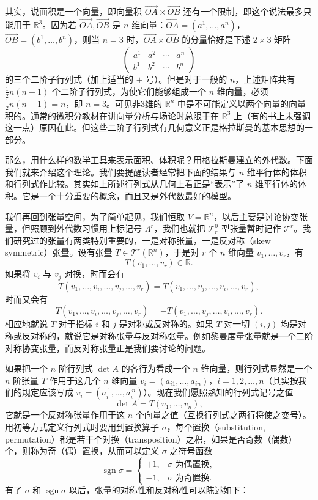 其实，说面积是一个向量，即向量积 $\overrightarrow{OA}\times\overrightarrow{OB}$ 还有一个限制，即这个说法最多只能用于 $\mathbb R^3$。因为若 $\overrightarrow{OA},\overrightarrow{OB}$ 是 $n$ 维向量：$\overrightarrow{OA}=(a^1,\ldots,a^n)$，$\overrightarrow{OB}=(b^1,\ldots,b^n)$，则当 $n=3$ 时，$\overrightarrow{OA}\times\overrightarrow{OB}$ 的分量恰好是下述 $2\times3$ 矩阵
\[
 \begin{pmatrix}a^1&a^2&\cdots&a^n\\ b^1&b^2&\cdots&b^n\end{pmatrix}
\]
的三个二阶子行列式（加上适当的 $\pm$ 号）。但是对于一般的 $n$，上述矩阵共有 $\frac12n(n-1)$ 个二阶子行列式，为使它们能够组成一个 $n$ 维向量，必须 $\frac12n(n-1)=n$，即 $n=3$。可见非3维的 $\mathbb R^n$ 中是不可能定义以两个向量的向量积的。通常的微积分教材在讲向量分析与场论时总限于在 $\mathbb R^3$ 上（有的书上未强调这一点）原因在此。但这些二阶子行列式有几何意义正是格拉斯曼的基本思想的一部分。

那么，用什么样的数学工具来表示面积、体积呢？用格拉斯曼建立的外代数。下面我们就来介绍这个理论。我们要提醒读者经常把下面的结果与 $n$ 维平行体的体积和行列式作比较。其实如上所述行列式从几何上看正是“表示”了 $n$ 维平行体的体积。它是一个十分重要的概念，而且又是外代数最好的模型。

我们再回到张量空间，为了简单起见，我们恒取 $V=\mathbb R^n$，以后主要是讨论协变张量，但照顾到外代数习惯用上标记号 $\Lambda^r$，我们也就把 $\mathcal T^0_r$ 型张量暂时记作 $\mathcal T^r$。我们研究过的张量有两类特别重要的，一是对称张量，一是反对称（skew symmetric）张量。设有张量 $T\in\mathcal T^r(\mathbb R^n)$，于是对 $r$ 个 $n$ 维向量 $v_1,\ldots,v_r$，有
\[
 T(v_1,\ldots,v_r)\in\mathbb R.
\]
如果将 $v_i$ 与 $v_j$ 对换，时而会有
\begin{equation}
 T(v_1,\ldots,v_i,\ldots,v_j,\ldots,v_r)
 =T(v_1,\ldots,v_j,\ldots,v_i,\ldots,v_r),
 \tag{19a}
\end{equation}
时而又会有
\begin{equation}
 T(v_1,\ldots,v_i,\ldots,v_j,\ldots,v_r)
 =-T(v_1,\ldots,v_j,\ldots,v_i,\ldots,v_r).
 \tag{19b}
\end{equation}
相应地就说 $T$ 对于指标 $i$ 和 $j$ 是对称或反对称的。如果 $T$ 对一切 $(i,j)$ 均是对称或反对称的，就说它是对称张量与反对称张量。例如黎曼度量张量就是一个二阶对称协变张量，而反对称张量正是我们要讨论的问题。

如果把一个 $n$ 阶行列式 $\det A$ 的各行为看成一个 $n$ 维向量，则行列式显然是一个 $n$ 阶张量 $T$ 作用于这几个 $n$ 维向量 $v_i=(a_{i1},\ldots,a_{in})$，$i=1,2,\ldots,n$（其实按我们的规定应该写成 $v_i=(a_i^{\ 1},\ldots,a_i^{\ n})$）。现在我们愿照熟知的行列式记号之值
\[
 \det A=T(v_1,\ldots,v_n),
\]
它就是一个反对称张量作用于这 $n$ 个向量之值（互换行列式之两行将使之变号）。用初等方式定义行列式时要用到置换算子 $\sigma$，每个置换（substitution, permutation）都是若干个对换（transposition）之积，如果是否奇数（偶数）个，则称为奇（偶）置换，从而可以定义 $\sigma$ 之符号函数
\[
 \operatorname{sgn}\sigma=
 \begin{cases}
 +1,&\sigma\text{ 为偶置换},\\
 -1,&\sigma\text{ 为奇置换}.
 \end{cases}
\]
有了 $\sigma$ 和 $\operatorname{sgn}\sigma$ 以后，张量的对称性和反对称性可以陈述如下：

